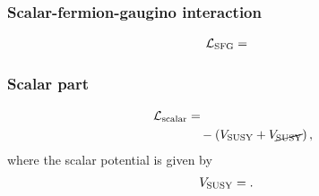 \documentclass[CheatSheet]{subfiles}
\begin{document}
\subsubsection{Scalar-fermion-gaugino interaction}
\begin{equation}
\begin{split}
  \mathcal L\w{SFG} &=
 
\end{split}
\end{equation}

\subsubsection{Scalar part}
\begin{equation}
\begin{split}
  \mathcal L\w{scalar} &=
 
\\&\quad -\left(V\w{SUSY} + V_{\cancel{\mathrm{SUSY}}}\right),
\end{split}
\end{equation}
where the scalar potential is given by
\begin{equation}
  \begin{split}
   V_{\mathrm{SUSY}} &= .
  \end{split}
\end{equation}
\end{document}
